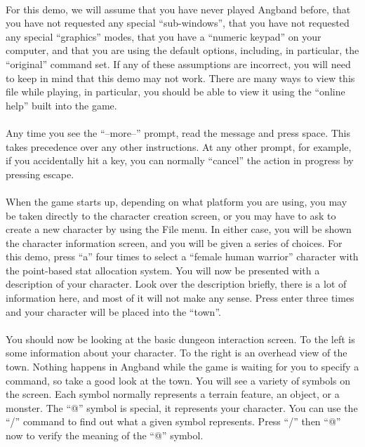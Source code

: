 \paragraph{}For this demo, we will assume that you have never played
Angband before, that you have not requested any special ``sub-windows'',
that you have not requested any special ``graphics'' modes, that you have
a ``numeric keypad'' on your computer, and that you are using the default
options, including, in particular, the ``original'' command set. If any of
these assumptions are incorrect, you will need to keep in mind that this
demo may not work. There are many ways to view this file while playing, in
particular, you should be able to view it using the ``online help'' built
into the game.

\paragraph{}Any time you see the ``--more--'' prompt, read the message and
press space.  This takes precedence over any other instructions. At any
other prompt, for example, if you accidentally hit a key, you can normally
``cancel'' the action in progress by pressing escape.

\paragraph{}When the game starts up, depending on what platform you are
using, you may be taken directly to the character creation screen, or you
may have to ask to create a new character by using the File menu. In
either case, you will be shown the character information screen, and you
will be given a series of choices. For this demo, press ``a'' four times
to select a ``female human warrior'' character with the point-based stat
allocation system. You will now be presented with a description of your
character. Look over the description briefly, there is a lot of
information here, and most of it will not make any sense. Press enter
three times and your character will be placed into the ``town''.

\paragraph{}You should now be looking at the basic dungeon interaction screen. To
the left is some information about your character. To the right is an
overhead view of the town. Nothing happens in Angband while the game is
waiting for you to specify a command, so take a good look at the town.
You will see a variety of symbols on the screen. Each symbol normally
represents a terrain feature, an object, or a monster. The ``@'' symbol
is special, it represents your character. You can use the ``/'' command
to find out what a given symbol represents. Press ``/'' then ``@'' now to
verify the meaning of the ``@'' symbol.

